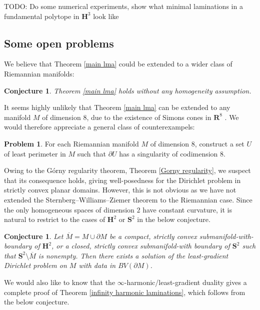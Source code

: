 \documentclass[reqno,12pt,letterpaper]{amsart}
\newcommand{\RR}{\mathbf{R}}
\newcommand{\Hyp}{\mathbf H}
\newcommand{\Sph}{\mathbf S}
\newtheorem{conjecture}[theorem]{Conjecture}
\theoremstyle{definition}
\newtheorem{problem}[theorem]{Problem}
\numberwithin{equation}{section}
\begin{document}
TODO: Do some numerical experiments, show what minimal laminations in a fundamental polytope in $\Hyp^3$ look like



\subsection{Some open problems}
We believe that Theorem \ref{main lma} could be extended to a wider class of Riemannian manifolds:

\begin{conjecture}\label{main conj}
Theorem \ref{main lma} holds without any homogeneity assumption.
\end{conjecture}

It seems highly unlikely that Theorem \ref{main lma} can be extended to any manifold $M$ of dimension $8$, due to the existence of Simons cones in $\RR^8$ \cite[Theorem A]{BOMBIERI1969}.
We would therefore appreciate a general class of counterexampels:

\begin{problem}
For each Riemannian manifold $M$ of dimension $8$, construct a set $U$ of least perimeter in $M$ such that $\partial U$ has a singularity of codimension $8$.
\end{problem}

Owing to the G\'orny regularity theorem, Theorem \ref{Gorny regularity}, we suspect that its consequence \cite[Theorem 1.1]{górny2017planar} holds, giving well-posedness for the Dirichlet problem in strictly convex planar domains.
However, this is not obvious as we have not extended the Sternberg--Williams--Ziemer theorem \cite{ZiemerWilliamsSternberg1992} to the Riemannian case.
Since the only homogeneous spaces of dimension $2$ have constant curvature, it is natural to restrict to the cases of $\Hyp^2$ or $\Sph^2$ in the below conjecture.

\begin{conjecture}
Let $\overline M = M \cup \partial M$ be a compact, strictly convex submanifold-with-boundary of $\Hyp^2$, or a closed, strictly convex submanifold-with boundary of $\Sph^2$ such that $\Sph^2 \setminus \overline M$ is nonempty.
Then there exists a solution of the least-gradient Dirichlet problem on $M$ with data in $BV(\partial M)$.
\end{conjecture}

We would also like to know that the $\infty$-harmonic/least-gradient duality gives a complete proof of Theorem \ref{infinity harmonic laminations}, which follows from the below conjecture.
\end{document}
